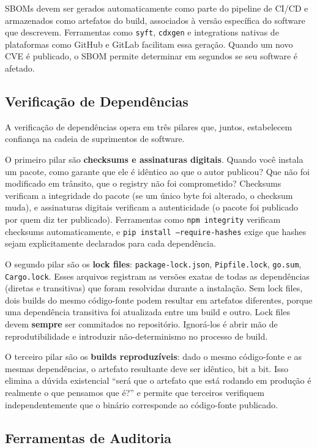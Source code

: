 SBOMs devem ser gerados automaticamente como parte do pipeline de
CI/CD e armazenados como artefatos do build, associados à versão específica do
software que descrevem. Ferramentas como \texttt{syft}, \texttt{cdxgen} e
integrations nativas de plataformas como GitHub e GitLab facilitam essa geração.
Quando um novo CVE é publicado, o SBOM permite determinar em segundos se seu
software é afetado.

\subsection{Verificação de Dependências}

A verificação de dependências opera em três pilares que, juntos,
estabelecem confiança na cadeia de suprimentos de software.

O primeiro pilar são \textbf{checksums e assinaturas digitais}. Quando você
instala um pacote, como garante que ele é idêntico ao que o autor publicou? Que
não foi modificado em trânsito, que o registry não foi comprometido? Checksums
verificam a integridade do pacote (se um único byte foi alterado, o checksum
muda), e assinaturas digitais verificam a autenticidade (o pacote foi publicado
por quem diz ter publicado). Ferramentas como \texttt{npm integrity} verificam
checksums automaticamente, e \texttt{pip install --require-hashes} exige que
hashes sejam explicitamente declarados para cada dependência.

O segundo pilar são os \textbf{lock files}: \texttt{package-lock.json},
\texttt{Pipfile.lock}, \texttt{go.sum}, \texttt{Cargo.lock}. Esses arquivos
registram as versões exatas de todas as dependências (diretas e transitivas) que
foram resolvidas durante a instalação. Sem lock files, dois builds do mesmo
código-fonte podem resultar em artefatos diferentes, porque uma dependência
transitiva foi atualizada entre um build e outro. Lock files devem
\textbf{sempre} ser commitados no repositório. Ignorá-los é abrir mão de
reprodutibilidade e introduzir não-determinismo no processo de build.

O terceiro pilar são os \textbf{builds reproduzíveis}: dado o mesmo código-fonte
e as mesmas dependências, o artefato resultante deve ser idêntico, bit a bit.
Isso elimina a dúvida existencial ``será que o artefato que está rodando em
produção é realmente o que pensamos que é?'' e permite que terceiros verifiquem
independentemente que o binário corresponde ao código-fonte publicado.

\subsection{Ferramentas de Auditoria}

